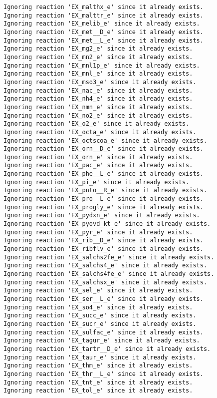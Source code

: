 \documentclass[
  letterpaper,
  DIV=11,
  numbers=noendperiod]{scrartcl}
\begin{document}
\begin{verbatim}
Ignoring reaction 'EX_malthx_e' since it already exists.
Ignoring reaction 'EX_malttr_e' since it already exists.
Ignoring reaction 'EX_melib_e' since it already exists.
Ignoring reaction 'EX_met__D_e' since it already exists.
Ignoring reaction 'EX_met__L_e' since it already exists.
Ignoring reaction 'EX_mg2_e' since it already exists.
Ignoring reaction 'EX_mn2_e' since it already exists.
Ignoring reaction 'EX_mnl1p_e' since it already exists.
Ignoring reaction 'EX_mnl_e' since it already exists.
Ignoring reaction 'EX_mso3_e' since it already exists.
Ignoring reaction 'EX_nac_e' since it already exists.
Ignoring reaction 'EX_nh4_e' since it already exists.
Ignoring reaction 'EX_nmn_e' since it already exists.
Ignoring reaction 'EX_no2_e' since it already exists.
Ignoring reaction 'EX_o2_e' since it already exists.
Ignoring reaction 'EX_octa_e' since it already exists.
Ignoring reaction 'EX_octscoa_e' since it already exists.
Ignoring reaction 'EX_orn__D_e' since it already exists.
Ignoring reaction 'EX_orn_e' since it already exists.
Ignoring reaction 'EX_pac_e' since it already exists.
Ignoring reaction 'EX_phe__L_e' since it already exists.
Ignoring reaction 'EX_pi_e' since it already exists.
Ignoring reaction 'EX_pnto__R_e' since it already exists.
Ignoring reaction 'EX_pro__L_e' since it already exists.
Ignoring reaction 'EX_progly_e' since it already exists.
Ignoring reaction 'EX_pydxn_e' since it already exists.
Ignoring reaction 'EX_pyovd_kt_e' since it already exists.
Ignoring reaction 'EX_pyr_e' since it already exists.
Ignoring reaction 'EX_rib__D_e' since it already exists.
Ignoring reaction 'EX_ribflv_e' since it already exists.
Ignoring reaction 'EX_salchs2fe_e' since it already exists.
Ignoring reaction 'EX_salchs4_e' since it already exists.
Ignoring reaction 'EX_salchs4fe_e' since it already exists.
Ignoring reaction 'EX_salchsx_e' since it already exists.
Ignoring reaction 'EX_sel_e' since it already exists.
Ignoring reaction 'EX_ser__L_e' since it already exists.
Ignoring reaction 'EX_so4_e' since it already exists.
Ignoring reaction 'EX_succ_e' since it already exists.
Ignoring reaction 'EX_sucr_e' since it already exists.
Ignoring reaction 'EX_sulfac_e' since it already exists.
Ignoring reaction 'EX_tagur_e' since it already exists.
Ignoring reaction 'EX_tartr__D_e' since it already exists.
Ignoring reaction 'EX_taur_e' since it already exists.
Ignoring reaction 'EX_thm_e' since it already exists.
Ignoring reaction 'EX_thr__L_e' since it already exists.
Ignoring reaction 'EX_tnt_e' since it already exists.
Ignoring reaction 'EX_tol_e' since it already exists.

\end{verbatim}
\end{document}
